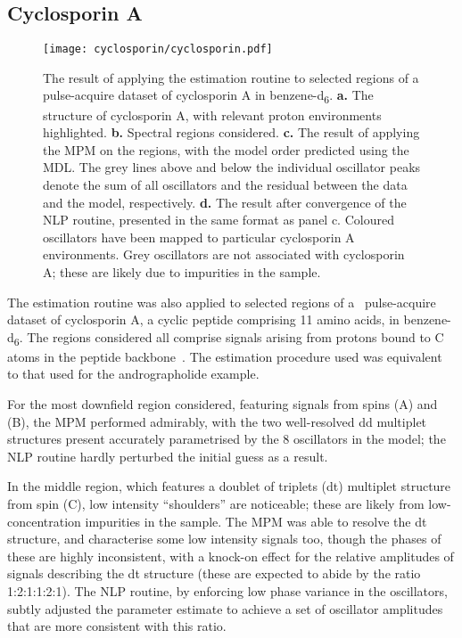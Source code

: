 \subsection{Cyclosporin A}
\label{subsec:cyclo}
\begin{figure}
    \texttt{[image: cyclosporin/cyclosporin.pdf]}
    \caption[
        The result of applying the estimation routine to selected regions of a
        pulse-acquire dataset of cyclosporin A.
    ]{
        The result of applying the estimation routine to selected regions of a
        pulse-acquire dataset of cyclosporin A in benzene-d\textsubscript{6}.
        \textbf{a.} The structure of cyclosporin A, with relevant proton
        environments highlighted.
        \textbf{b.} Spectral regions considered.
        \textbf{c.} The result of applying the \acs{MPM} on the regions, with
        the model order predicted using the \acs{MDL}.
        The grey lines above and below the individual oscillator peaks denote
        the sum of all oscillators and the residual between the data and the
        model, respectively.
        \textbf{d.} The result after convergence of the \acs{NLP} routine,
        presented in the same format as panel c.
        Coloured oscillators have been mapped to particular cyclosporin A
        environments. Grey oscillators are not associated with
        cyclosporin A; these are likely due to impurities in the sample.
    }
    \label{fig:cyclosporin}
\end{figure}
The estimation routine was also applied to selected regions of a
\proton\ pulse-acquire dataset of cyclosporin A,
a cyclic peptide comprising 11 amino
acids, in benzene-d\textsubscript{6}.
The regions considered all comprise
signals arising from protons bound to C\textsuperscript{\textalpha} atoms in
the peptide backbone~\cite{Verma2018}.
The estimation procedure used was equivalent to
that used for the andrographolide example.

For the most downfield region
considered, featuring signals from spins (A) and (B), the \ac{MPM} performed
admirably, with the two well-resolved dd multiplet structures present
accurately parametrised by the 8 oscillators in the model; the \ac{NLP} routine
hardly perturbed the initial guess as a result.

In the middle region, which features a doublet of triplets (dt) multiplet structure
from spin (C), low intensity ``shoulders'' are noticeable;
these are likely from low-concentration impurities in the sample. The \ac{MPM}
was able to resolve the dt structure, and characterise
some low intensity signals too, though the phases of these are highly
inconsistent, with a knock-on effect for the relative amplitudes of signals
describing the dt structure (these are expected to abide by the ratio
1:2:1:1:2:1). The \ac{NLP} routine, by enforcing low phase variance in the
oscillators, subtly adjusted the parameter estimate to achieve a set of
oscillator amplitudes that are more consistent with this ratio.

